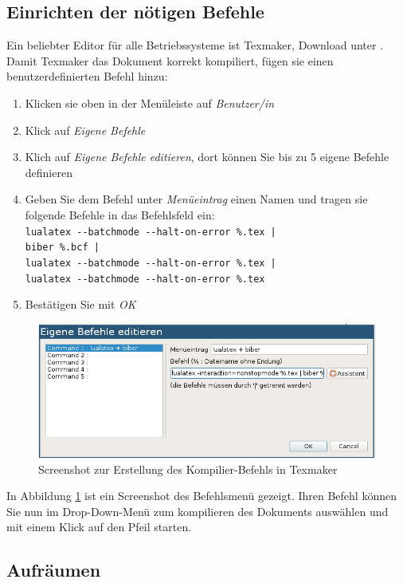 \subsection{Einrichten der nötigen Befehle}
Ein beliebter Editor für alle Betriebssysteme ist Texmaker, Download unter \cite{texmaker}.
Damit Texmaker das Dokument korrekt kompiliert, fügen sie einen benutzerdefinierten Befehl hinzu:
\begin{enumerate}
    \item Klicken sie oben in der Menüleiste auf \emph{Benutzer/in}
    \item Klick auf \emph{Eigene Befehle}
    \item Klich auf \emph{Eigene Befehle editieren}, dort können Sie bis zu 5 eigene Befehle definieren
    \item Geben Sie dem Befehl unter \emph{Menüeintrag} einen Namen und tragen sie folgende Befehle in das Befehlsfeld ein: \\
      \verb+lualatex --batchmode --halt-on-error %.tex |+ \\
          \verb+biber %.bcf |+ \\
          \verb+lualatex --batchmode --halt-on-error %.tex |+ \\
          \verb+lualatex --batchmode --halt-on-error %.tex+ 
    \item Bestätigen Sie mit \emph{OK}
\end{enumerate}

\begin{figure}
    \centering
    \includegraphics[width=12cm]{Plots/texmaker.png}
    \caption{Screenshot zur Erstellung des Kompilier-Befehls in Texmaker}
    \label{fig:texmaker}
\end{figure}


In Abbildung \ref{fig:texmaker} ist ein Screenshot des Befehlsmenü gezeigt. Ihren Befehl können Sie nun im Drop-Down-Menü zum 
kompilieren des Dokuments auswählen und mit einem Klick auf den Pfeil starten.

\subsection{Aufräumen}

